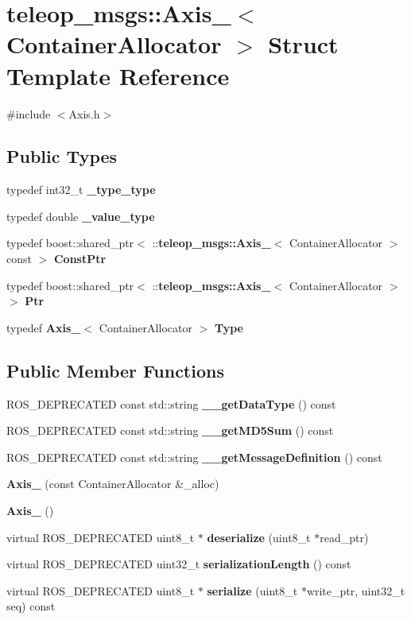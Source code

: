 \section{teleop\_\-msgs::Axis\_\-$<$ ContainerAllocator $>$ Struct Template Reference}
\label{structteleop__msgs_1_1Axis__}


{\ttfamily \#include $<$Axis.h$>$}

\subsection*{Public Types}
\begin{DoxyCompactItemize}
\item 
typedef int32\_\-t {\bf \_\-type\_\-type}
\item 
typedef double {\bf \_\-value\_\-type}
\item 
typedef boost::shared\_\-ptr$<$ ::{\bf teleop\_\-msgs::Axis\_\-}$<$ ContainerAllocator $>$ const  $>$ {\bf ConstPtr}
\item 
typedef boost::shared\_\-ptr$<$ ::{\bf teleop\_\-msgs::Axis\_\-}$<$ ContainerAllocator $>$ $>$ {\bf Ptr}
\item 
typedef {\bf Axis\_\-}$<$ ContainerAllocator $>$ {\bf Type}
\end{DoxyCompactItemize}
\subsection*{Public Member Functions}
\begin{DoxyCompactItemize}
\item 
ROS\_\-DEPRECATED const std::string {\bf \_\-\_\-getDataType} () const 
\item 
ROS\_\-DEPRECATED const std::string {\bf \_\-\_\-getMD5Sum} () const 
\item 
ROS\_\-DEPRECATED const std::string {\bf \_\-\_\-getMessageDefinition} () const 
\item 
{\bf Axis\_\-} (const ContainerAllocator \&\_\-alloc)
\item 
{\bf Axis\_\-} ()
\item 
virtual ROS\_\-DEPRECATED uint8\_\-t $\ast$ {\bf deserialize} (uint8\_\-t $\ast$read\_\-ptr)
\item 
virtual ROS\_\-DEPRECATED uint32\_\-t {\bf serializationLength} () const 
\item 
virtual ROS\_\-DEPRECATED uint8\_\-t $\ast$ {\bf serialize} (uint8\_\-t $\ast$write\_\-ptr, uint32\_\-t seq) const 
\end{DoxyCompactItemize}
